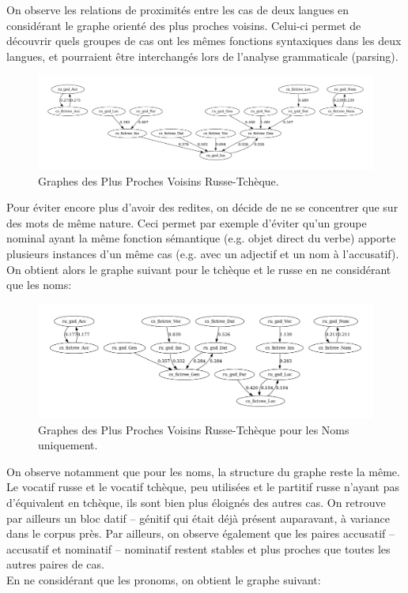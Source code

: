 \documentclass{cours}
\begin{document}
On observe les relations de proximités entre les cas de deux langues en considérant le graphe orienté des plus proches voisins.
Celui-ci permet de découvrir quels groupes de cas ont les mêmes fonctions syntaxiques dans les deux langues, et pourraient être interchangés lors de l'analyse grammaticale (parsing).

\begin{figure}[H]
	\centering
	\includegraphics[width=\textwidth]{Figures/GNN/gnn_ru_gsd_cs_fictree}
	\caption{Graphes des Plus Proches Voisins Russe-Tchèque.}
\end{figure}

Pour éviter encore plus d'avoir des redites, on décide de ne se concentrer que sur des mots de même nature.
Ceci permet par exemple d'éviter qu'un groupe nominal ayant la même fonction sémantique (e.g. objet direct du verbe) apporte plusieurs instances d'un même cas (e.g. avec un adjectif et un nom à l'accusatif).
On obtient alors le graphe suivant pour le tchèque et le russe en ne considérant que les noms:

\begin{figure}[H]
	\centering
	\includegraphics[width=\textwidth]{Figures/GNN/gnn_ru_gsd_cs_fictree_Nouns_Only}
	\caption{Graphes des Plus Proches Voisins Russe-Tchèque pour les Noms uniquement.}
\end{figure}

On observe notamment que pour les noms, la structure du graphe reste la même.
Le vocatif russe et le vocatif tchèque, peu utilisées et le partitif russe n'ayant pas d'équivalent en tchèque, ils sont bien plus éloignés des autres cas.
On retrouve par ailleurs un bloc datif -- génitif qui était déjà présent auparavant, à variance dans le corpus près.
Par ailleurs, on observe également que les paires accusatif -- accusatif et nominatif -- nominatif restent stables et plus proches que toutes les autres paires de cas.\\
En ne considérant que les pronoms, on obtient le graphe suivant:
\end{document}
